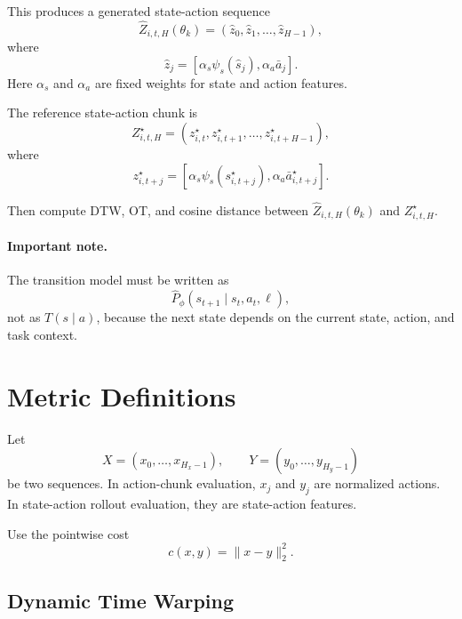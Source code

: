 \documentclass[11pt]{article}
\begin{document}
This produces a generated state-action sequence
\begin{equation}
\widehat{Z}_{i,t,H}(\theta_k)
=
(\hat{z}_0,\hat{z}_1,\ldots,\hat{z}_{H-1}),
\end{equation}
where
\begin{equation}
\hat{z}_j = [\alpha_s\psi_s(\hat{s}_j),\alpha_a\bar{a}_j].
\end{equation}
Here $\alpha_s$ and $\alpha_a$ are fixed weights for state and action features.

The reference state-action chunk is
\begin{equation}
Z^{\star}_{i,t,H}
=
(z^{\star}_{i,t},z^{\star}_{i,t+1},\ldots,z^{\star}_{i,t+H-1}),
\end{equation}
where
\begin{equation}
 z^{\star}_{i,t+j}=[\alpha_s\psi_s(s^{\star}_{i,t+j}),\alpha_a\bar{a}^{\star}_{i,t+j}].
\end{equation}

Then compute DTW, OT, and cosine distance between $\widehat{Z}_{i,t,H}(\theta_k)$ and $Z^{\star}_{i,t,H}$.

\paragraph{Important note.}
The transition model must be written as
\begin{equation}
\widehat{P}_{\phi}(s_{t+1}\mid s_t,a_t,\ell),
\end{equation}
not as $T(s\mid a)$, because the next state depends on the current state, action, and task context.

\section{Metric Definitions}

Let
\begin{equation}
X=(x_0,\ldots,x_{H_x-1}),
\qquad
Y=(y_0,\ldots,y_{H_y-1})
\end{equation}
be two sequences. In action-chunk evaluation, $x_j$ and $y_j$ are normalized actions. In state-action rollout evaluation, they are state-action features.

Use the pointwise cost
\begin{equation}
c(x,y)=\|x-y\|_2^2.
\end{equation}

\subsection{Dynamic Time Warping}
\end{document}
